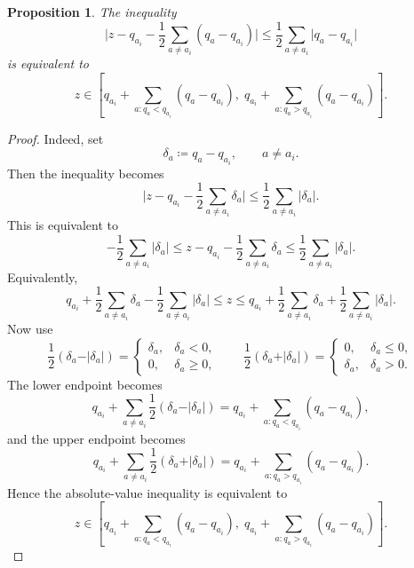 \documentclass{article}
\newtheorem{proposition}[theorem]{Proposition}
\theoremstyle{definition}
\theoremstyle{remark}
\begin{document}
\begin{proposition}
\label{prop:equivinreductiontoMDPinterval}
The inequality  
\[
    \lvert
        z-q_{a_i}
        -
        \frac12\sum_{a\neq a_i}(q_a-q_{a_i})
    \rvert
    \le
    \frac12\sum_{a\neq a_i}\vert q_a-q_{a_i}\vert  
\]
is equivalent to 
\[
    z
    \in
    \left[
        q_{a_i}
        +
        \sum_{a:q_a<q_{a_i}}(q_a-q_{a_i}),
        \;
        q_{a_i}
        +
        \sum_{a:q_a>q_{a_i}}(q_a-q_{a_i})
    \right].
\]
\end{proposition}
\begin{proof}
Indeed, set
\[
    \delta_a \coloneqq q_a-q_{a_i},
    \qquad a\neq a_i.
\]
Then the inequality becomes
\[
    \lvert
        z-q_{a_i}
        -
        \frac12\sum_{a\neq a_i}\delta_a
    \rvert
    \le
    \frac12\sum_{a\neq a_i}\vert \delta_a\vert .
\]
This is equivalent to 
\[
    -\frac12\sum_{a\neq a_i}\vert \delta_a\vert 
    \le
    z-q_{a_i}-\frac12\sum_{a\neq a_i}\delta_a
    \le
    \frac12\sum_{a\neq a_i}\vert \delta_a\vert .
\]
Equivalently,
\[
    q_{a_i}
    +
    \frac12\sum_{a\neq a_i}\delta_a
    -
    \frac12\sum_{a\neq a_i}\vert \delta_a\vert 
    \le z \le
    q_{a_i}
    +
    \frac12\sum_{a\neq a_i}\delta_a
    +
    \frac12\sum_{a\neq a_i}\vert \delta_a\vert .
\]
Now use
\[
    \frac12(\delta_a-\vert \delta_a\vert )
    =
    \begin{cases}
        \delta_a, & \delta_a<0,\\
        0, & \delta_a\ge 0,
    \end{cases}
    \qquad
    \frac12(\delta_a+\vert \delta_a\vert )
    =
    \begin{cases}
        0, & \delta_a\le 0,\\
        \delta_a, & \delta_a>0.
    \end{cases}
\]
The lower endpoint becomes
\[
    q_{a_i}
    +
    \sum_{a\neq a_i}
    \frac12(\delta_a-\vert \delta_a\vert )
    =
    q_{a_i}
    +
    \sum_{a:q_a<q_{a_i}}
    (q_a-q_{a_i}),
\]
and the upper endpoint becomes
\[
    q_{a_i}
    +
    \sum_{a\neq a_i}
    \frac12(\delta_a+\vert \delta_a\vert )
    =
    q_{a_i}
    +
    \sum_{a:q_a>q_{a_i}}
    (q_a-q_{a_i}).
\]
Hence the absolute-value inequality is equivalent to
\[
    z
    \in
    \left[
        q_{a_i}
        +
        \sum_{a:q_a<q_{a_i}}(q_a-q_{a_i}),
        \;
        q_{a_i}
        +
        \sum_{a:q_a>q_{a_i}}(q_a-q_{a_i})
    \right].
\]
\end{proof}
\end{document}
